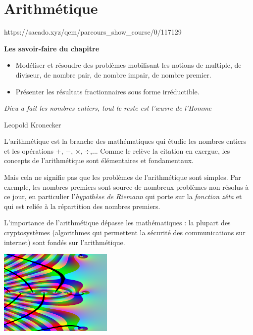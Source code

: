 \chapter{Arithmétique}
{https://sacado.xyz/qcm/parcours_show_course/0/117129}
{


 \begin{CpsCol}
\textbf{Les savoir-faire du chapitre}
 \begin{itemize}
\item Modéliser et résoudre des problèmes mobilisant les notions de multiple, de diviseur, de nombre pair, de nombre impair, de nombre premier.
\item Présenter les résultats fractionnaires sous forme irréductible.
 \end{itemize}
 \end{CpsCol}

 \begin{His}
   
  \hfill{\em Dieu a fait les nombres entiers, tout le reste est l'œuvre de l'Homme}

  \hfill{Leopold Kronecker}

     \bigskip

     
\begin{minipage}[b]{0.6\textwidth}{L'arithmétique est la branche des mathématiques qui étudie
  les nombres entiers et les opérations $+$, $-$, $\times$, $\div$,...
  Comme le relève la citation en exergue, les concepts de l'arithmétique
  sont élémentaires et fondamentaux.

  Mais cela ne signifie pas que
  les problèmes de l'arithmétique sont simples. Par exemple,
  les nombres premiers sont source de nombreux problèmes
  non résolus à ce jour, en particulier l'{\em hypothèse de Riemann}
  qui porte sur la {\em fonction zêta} et qui est reliée à la
  répartition des nombres premiers.

  L'importance de l'arithmétique dépasse les mathématiques : la plupart des
  cryptosystèmes (algorithmes qui permettent la sécurité des
  communications sur internet) sont fondés sur l'arithmétique.
  }
\end{minipage}
\begin{minipage}[b]{0.4\textwidth}
\begin{center}    
  \includegraphics[width=5.5cm]{FIG/zeta7b.png}


\end{center}
\end{minipage}
\end{His}}
